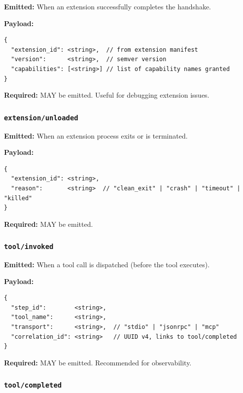 \textbf{Emitted:} When an extension successfully completes the handshake.

\textbf{Payload:}
\begin{verbatim}
{
  "extension_id": <string>,  // from extension manifest
  "version":      <string>,  // semver version
  "capabilities": [<string>] // list of capability names granted
}
\end{verbatim}

\textbf{Required:} MAY be emitted. Useful for debugging extension issues.


\subsubsection{\texttt{extension/unloaded}}

\textbf{Emitted:} When an extension process exits or is terminated.

\textbf{Payload:}
\begin{verbatim}
{
  "extension_id": <string>,
  "reason":       <string>  // "clean_exit" | "crash" | "timeout" | "killed"
}
\end{verbatim}

\textbf{Required:} MAY be emitted.


\subsubsection{\texttt{tool/invoked}}

\textbf{Emitted:} When a tool call is dispatched (before the tool executes).

\textbf{Payload:}
\begin{verbatim}
{
  "step_id":        <string>,
  "tool_name":      <string>,
  "transport":      <string>,  // "stdio" | "jsonrpc" | "mcp"
  "correlation_id": <string>   // UUID v4, links to tool/completed
}
\end{verbatim}

\textbf{Required:} MAY be emitted. Recommended for observability.


\subsubsection{\texttt{tool/completed}}

